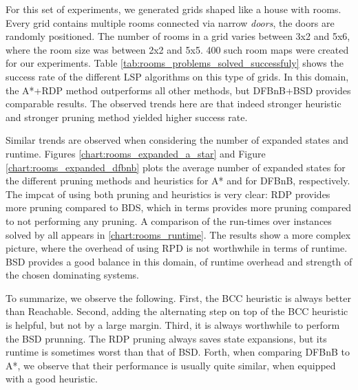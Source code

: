 \documentclass[letterpaper]{article} %
\newcommand\Yossi[1]{\nb{\textbf{Yossi:}}{green}{#1}}
\begin{document}



 For this set of experiments, we generated grids shaped like a house with rooms. 
 Every grid contains multiple rooms connected via narrow \textit{doors}, the doors are randomly positioned. %
 The number of rooms in a grid varies between 3x2 and 5x6, where the room size was between 2x2 and 5x5. %
 400 such room maps were created for our experiments. 
 Table \ref{tab:rooms_problems_solved_successfuly} shows the success rate of the different LSP algorithms on this type of grids. 
 In this domain, the A*+RDP method outperforms all other methods, but DFBnB+BSD provides comparable results. 
 The observed trends here are that indeed stronger heuristic and stronger pruning method yielded higher success rate. 


Similar trends are observed when considering the number of expanded states and runtime. Figures \ref{chart:rooms_expanded_a_star} and Figure \ref{chart:rooms_expanded_dfbnb} plots the average number of expanded states for the different pruning methods and heuristics 
for A* and for DFBnB, respectively. The impcat of using both pruning and heuristics is very clear: RDP provides more pruning compared to BDS, which in terms provides more pruning compared to not performing any pruning. A comparison of the run-times over instances solved by all appears in \ref{chart:rooms_runtime}. The results show a more complex picture, where the overhead of using RPD is not worthwhile in terms of runtime. BSD provides a good balance in this domain, of runtime overhead and strength of the chosen dominating systems. 



To summarize, we observe the following. First, the BCC heuristic is always better than Reachable. 
Second, adding the alternating step on top of the BCC heuristic is helpful, but not by a large margin. 
Third, it is always worthwhile to perform the BSD prunning. The RDP pruning always saves state expansions, but its runtime is sometimes worst than that of BSD. 
Forth, when comparing DFBnB to A*, we observe that their performance is usually quite similar, when equipped with a good heuristic. 
\end{document}
